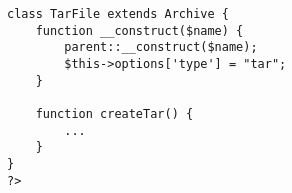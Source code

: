\begin{lstlisting}[label=compress_tar,caption=Empaquetadores Tar.]
class TarFile extends Archive {
	function __construct($name) {
		parent::__construct($name);
		$this->options['type'] = "tar";
	}

	function createTar() {
		...
	}
}
?>
\end{lstlisting}
